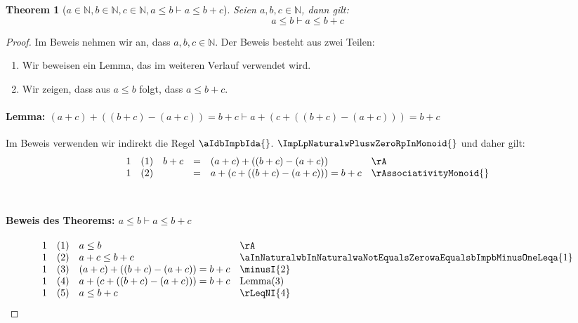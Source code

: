 \documentclass{book}
\theoremstyle{plain}
\newtheorem{theorem}{Theorem}
\theoremstyle{remark}
\theoremstyle{definition}
\begin{document}
\label{aInNaturalwbInNaturalwcInNaturalwaLeqbImpaLeqbPlusc}
\begin{theorem}[\(a\in\mathbb{N},b\in\mathbb{N},c\in\mathbb{N}, a\leq b\vdash a\leq b+c\)]
Seien \(a,b,c\in\mathbb{N}\), dann gilt:
\[a\leq b\vdash a\leq b+c\]
\end{theorem}
\begin{proof}
Im Beweis nehmen wir an, dass \(a,b,c\in\mathbb{N}\). Der Beweis besteht aus zwei Teilen:
\begin{enumerate}
    \item Wir beweisen ein Lemma, das im weiteren Verlauf verwendet wird.
    \item Wir zeigen, dass aus \(a \leq b\) folgt, dass \(a \leq b+c\).
\end{enumerate}

\paragraph{Lemma: \((a+c)+((b+c)-(a+c))=b+c \vdash a+(c+((b+c)-(a+c)))=b+c\)}

Im Beweis verwenden wir indirekt die Regel \(\aIdbImpbIda{}\).  \(\ImpLpNaturalwPluswZeroRpInMonoid{}\) und daher gilt:\\
        \[
	\begin{array}{llclll}
            1     &  (1) & b+c&=&(a+c)+((b+c)-(a+c)) & \rA \\
            1     &  (2) & &=&a+(c+((b+c)-(a+c)))=b+c & \rAssociativityMonoid{} \\
    \end{array}
	\]
    \\
\paragraph{Beweis des Theorems: \(a \leq b \vdash a \leq b+c\)}
        \[
	\begin{array}{llll}
            1     &  (1) & a\leq b & \rA \\
            1     &  (2) & a+c\leq b+c & \aInNaturalwbInNaturalwaNotEqualsZerowaEqualsbImpbMinusOneLeqa{1} \\
            1     &  (3) & (a+c)+((b+c)-(a+c))=b+c & \minusI{2} \\
            1     &  (4) & a+(c+((b+c)-(a+c)))=b+c & \text{Lemma(3)} \\
            1     &  (5) & a\leq b+c & \rLeqNI{4} \\
    \end{array}
	\]
\end{proof}
\end{document}
